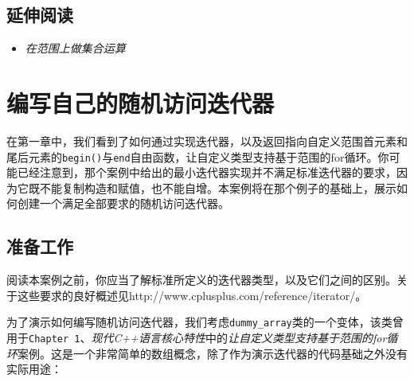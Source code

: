 
\subsection{延伸阅读}



\begin{itemize}
\item \textit{在范围上做集合运算}

\end{itemize}



\section{编写自己的随机访问迭代器}



在第一章中，我们看到了如何通过实现迭代器，以及返回指向自定义范围首元素和尾后元素的\texttt{begin()}与\texttt{end}自由函数，让自定义类型支持基于范围的for循环。你可能已经注意到，那个案例中给出的最小迭代器实现并不满足标准迭代器的要求，因为它既不能复制构造和赋值，也不能自增。本案例将在那个例子的基础上，展示如何创建一个满足全部要求的随机访问迭代器。



\subsection{准备工作}



阅读本案例之前，你应当了解标准所定义的迭代器类型，以及它们之间的区别。关于这些要求的良好概述见http://\allowbreak{}www.\allowbreak{}cplusplus.\allowbreak{}com/\allowbreak{}reference/\allowbreak{}iterator/\allowbreak{}。



为了演示如何编写随机访问迭代器，我们考虑\texttt{dummy\_\allowbreak{}array}类的一个变体，该类曾用于\texttt{Chapter 1}、\textit{现代C++语言核心特性}中的\textit{让自定义类型支持基于范围的for循环}案例。这是一个非常简单的数组概念，除了作为演示迭代器的代码基础之外没有实际用途：



